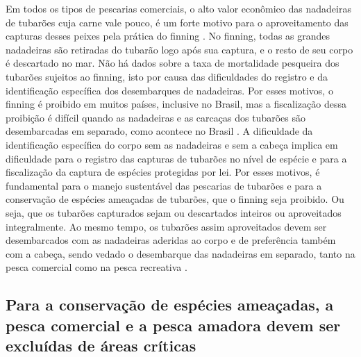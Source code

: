 \documentclass[a4paper,11pt,twoside,showtrims,onecolumn,openright,final]{memoir}
\begin{document}
Em todos os tipos de pescarias comerciais, o alto valor econômico das nadadeiras de 
tubarões cuja carne vale pouco, é um forte motivo para o aproveitamento das capturas 
desses peixes pela prática do finning \citep{camhi1998,stone1998}. %
No finning, todas as grandes nadadeiras são retiradas do tubarão logo após sua captura,
e o resto de seu corpo é descartado no mar. Não há dados sobre a taxa de mortalidade pesqueira dos 
tubarões sujeitos ao finning, isto por causa das dificuldades do registro e da identificação específica
dos desembarques de nadadeiras. Por esses motivos, o finning é proibido em muitos países, inclusive no Brasil, 
mas a fiscalização dessa proibição é difícil quando as nadadeiras e as carcaças 
dos tubarões são desembarcadas em separado, como acontece no Brasil \citep{vooren2003}. %
A dificuldade da identificação específica do corpo sem as nadadeiras e sem a cabeça implica 
em dificuldade para o registro das capturas de tubarões no nível de espécie e para a fiscalização da 
captura  de espécies protegidas por lei. Por esses motivos,  é fundamental para o manejo sustentável 
das pescarias de tubarões e para a conservação de espécies ameaçadas de tubarões, que o finning seja 
proibido. Ou seja,  que os tubarões capturados sejam ou descartados inteiros ou aproveitados integralmente. 
Ao mesmo tempo, os tubarões assim aproveitados devem ser desembarcados com as nadadeiras aderidas ao corpo 
e de preferência também com a cabeça, sendo vedado o desembarque das nadadeiras em separado, tanto 
na pesca comercial como na pesca recreativa \citep{musick2000b}. %

\subsection*{Para a conservação de espécies ameaçadas, a pesca comercial e a pesca  amadora 
             devem ser excluídas de áreas críticas}
\end{document}
